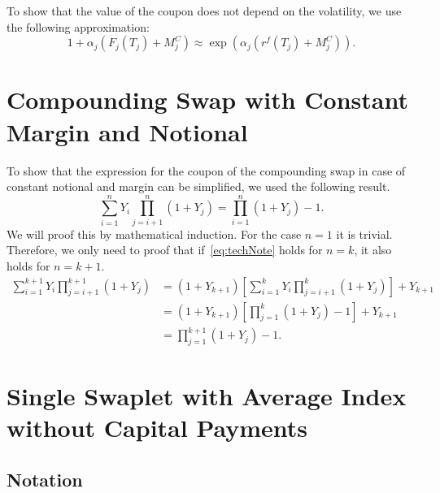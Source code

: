 \documentclass[]{pmv_report} %
\begin{document}
To show that the value of the coupon does not depend on the volatility, we use the following approximation:
\begin{equation*}
1+\alpha_j \left( F_j(T_j)+M_j^C \right)\approx \exp(\alpha_j(r^f(T_j)+M_j^C )).
\end{equation*}

\section{Compounding Swap with Constant Margin and Notional}
\label{sec:CompConst}
To show that the expression for the coupon of the compounding swap in case of constant notional and margin can be simplified, we used the following result.
\begin{equation}\label{eq:techNote}
  \sum_{i=1}^n Y_i \prod_{j=i+1}^n (1+ Y_j) = \prod_{i=1}^n (1+ Y_j) - 1.
\end{equation}
We will proof this by mathematical induction.
For the case $ n = 1$ it is trivial.
Therefore, we only need to proof that if~\eqref{eq:techNote} holds for $n = k$, it also holds
for $n = k+1$.
\begin{align}
  \sum_{i=1}^{k+1} Y_i \prod_{j=i+1}^{k+1} (1+ Y_j) &= (1 + Y_{k+1}) \left[ \sum_{i=1}^k Y_i \prod_{j=i+1}^k (1+ Y_j) \right] + Y_{k+1} \nonumber\\
  &= (1 + Y_{k+1}) \left[ \prod_{j=1}^k (1+ Y_j) - 1 \right] + Y_{k+1} \nonumber\\
  &= \prod_{j=1}^{k+1} (1+ Y_j) - 1.
\end{align}


\section{Single Swaplet with Average Index without Capital Payments}
\label{sec:AverageIndex}

\subsection*{Notation}
\end{document}
